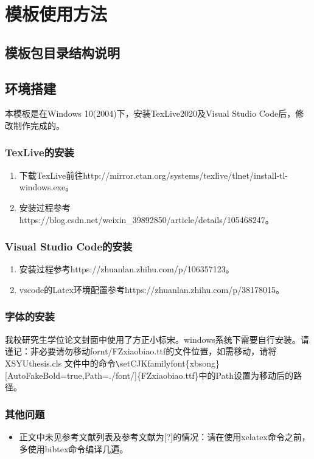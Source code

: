\chapter{模板使用方法}
\section{模板包目录结构说明}
\section{环境搭建}
本模板是在Windows 10(2004)下，安装TexLive2020及Visual Studio Code后，修改制作完成的。
\subsection{TexLive的安装}
\begin{enumerate}
    \item 下载TexLive前往http://mirror.ctan.org/systems/texlive/tlnet/install-tl-windows.exe。
    \item 安装过程参考https://blog.csdn.net/weixin\_39892850/article/details/105468247。
\end{enumerate}
\subsection{Visual Studio Code的安装}
\begin{enumerate}
    \item 安装过程参考https://zhuanlan.zhihu.com/p/106357123。
    \item vscode的Latex环境配置参考https://zhuanlan.zhihu.com/p/38178015。
\end{enumerate}
\subsection{字体的安装}
我校研究生学位论文封面中使用了方正小标宋。windows系统下需要自行安装。请谨记：非必要请勿移动fornt/FZxiaobiao.ttf的文件位置，如需移动，请将 XSYUthesis.cls 文件中的命令\verb|\|setCJKfamilyfont\{xbsong\}[AutoFakeBold=true,Path=./font/]\{FZxiaobiao.ttf\}中的Path设置为移动后的路径。
\subsection{其他问题}
\begin{itemize}
    \item 正文中未见参考文献列表及参考文献为[?]的情况：请在使用xelatex命令之前，多使用bibtex命令编译几遍。
\end{itemize}
